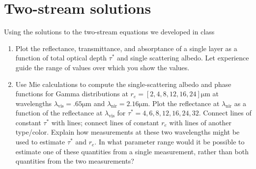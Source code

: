 \documentclass{article}
\begin{document}
\section{Two-stream solutions}

Using the solutions to the two-stream equations we developed in class
\begin{enumerate}
\item Plot the reflectance, transmittance, and absorptance of a single layer as a function of total optical depth $\tau^*$ and single scattering albedo. Let experience guide the range of values over which you show the values. 
\item Use Mie calculations to compute the single-scattering albedo and phase functions for Gamma distributions at $r_e = [2, 4, 8, 12, 16, 24]  \si{\micro\meter}$ at wavelengths $\lambda_{\textrm{vis}} = .65  \si{\micro\meter}$ and $\lambda_{\textrm{nir}} = 2.16  \si{\micro\meter}$. Plot the reflectance at $\lambda_{\textrm{nir}}$ as a function of the reflectance at $\lambda_{\textrm{vis}}$ for $\tau^* = 4, 6, 8, 12, 16, 24, 32$. Connect lines of constant $\tau^*$ with lines; connect lines of constant $r_e$ with lines of another type/color. Explain how measurements at these two wavelengths might be used to estimate $\tau^*$ and $r_e$. In what parameter range would it be possible to estimate one of these quantities from a single measurement, rather than both quantities from the two measurements? 
\end{enumerate}
\end{document}
